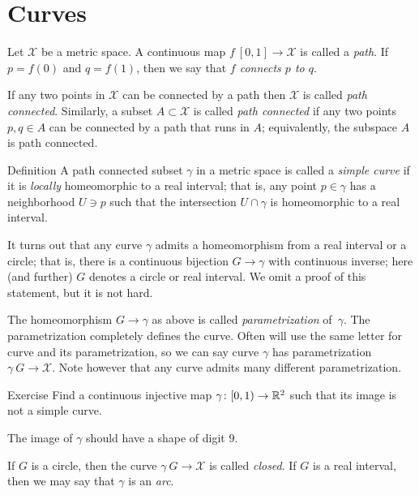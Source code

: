 \chapter{Curves}

Let $\mathcal{X}$ be a metric space.
A continuous map $f\:[0,1]\to\mathcal{X}$ is called a \emph{path}.
If $p=f(0)$ and $q=f(1)$, then we say that \emph{$f$ connects $p$ to $q$}.

If any two points in $\mathcal{X}$ can be connected by a path then $\mathcal{X}$ is called \emph{path connected}.
Similarly, a subset $A\subset \mathcal{X}$ is called \emph{path connected} if any two points $p,q\in A$ can be connected by a path that runs in $A$;
equivalently, the subspace $A$ is path connected.


\begin{thm}{Definition} 
A path connected subset $\gamma$ in a metric space is called a \emph{simple curve} if it is \emph{locally} homeomorphic to a real interval; that is, any point $p\in\gamma$ has a neighborhood $U\ni p$ such that the intersection
$U\cap \gamma$ is homeomorphic to a real interval.
\end{thm} %

It turns out that any curve $\gamma$ admits a homeomorphism from a real interval or a circle;
that is, there is a continuous bijection $G\to \gamma$ with continuous inverse;
here (and further) $G$ denotes a circle or real interval.
We omit a proof of this statement, but it is not hard.

The homeomorphism $G\to \gamma$ as above is called \emph{parametrization} of~$\gamma$.
The parametrization completely defines the curve.
Often will use the same letter for curve and its parametrization, so we can say curve $\gamma$ has parametrization $\gamma\:G\to \mathcal{X}$.
Note however that any curve admits many different parametrization. 

\begin{thm}{Exercise}
Find a continuous injective map $\gamma\colon[0,1)\to\mathbb{R}^2$ such that its image is not a simple curve.
\end{thm}

 The image of $\gamma$ should have a shape of digit $9$.


If $G$ is a circle, then the curve $\gamma\:G\to \mathcal{X}$ is called \emph{closed}.
If $G$ is a real interval, then  we may say that $\gamma$ is an \emph{arc}.


